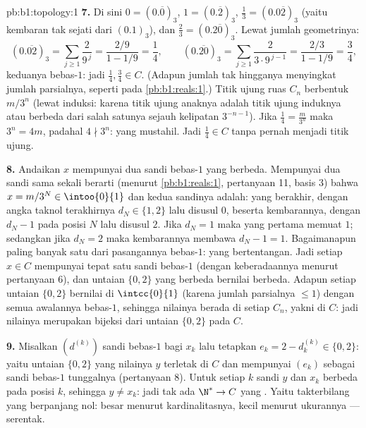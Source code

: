 \begin{solution}{pb:b1:topology:1}
\textbf{7.} Di sini $0 = (0.\overline 0)_3$, $1 = (0.\overline 2)_3$,
$\frac13 = (0.0\overline{2})_3$ (yaitu kembaran tak sejati dari $(0.1)_3$),
dan $\frac23 = (0.2\overline{0})_3$. Lewat jumlah geometrinya:
\[
(0.\overline{02})_3 = \sum_{j\geq1} \frac{2}{9^{\,j}}
= \frac{2/9}{1 - 1/9} = \frac14 ,
\qquad
(0.\overline{20})_3 = \sum_{j\geq1} \frac{2}{3\cdot 9^{\,j-1}}
= \frac{2/3}{1 - 1/9} = \frac34 ,
\]
keduanya bebas-$1$: jadi $\frac14, \frac34 \in C$. (Adapun jumlah tak hingganya
menyingkat  jumlah parsialnya, seperti pada \cref{pb:b1:reals:1}.)
Titik ujung ruas $C_n$ berbentuk $m/3^n$
(lewat induksi: karena titik ujung anaknya adalah titik ujung induknya atau berbeda
dari salah satunya sejauh kelipatan $3^{-n-1}$). Jika $\frac14 =
\frac{m}{3^n}$ maka $3^n = 4m$, padahal $4 \nmid 3^n$: yang mustahil.
Jadi $\frac14 \in C$ tanpa pernah menjadi titik ujung.

\textbf{8.} Andaikan $x$ mempunyai dua sandi bebas-$1$ yang berbeda. Mempunyai
dua sandi sama sekali berarti (menurut \cref{pb:b1:reals:1}, pertanyaan 11, basis
$3$) bahwa $x = m/3^N \in \intoo{0}{1}$ dan kedua sandinya adalah:
yang berakhir, dengan angka taknol terakhirnya $d_N \in \{1, 2\}$
lalu disusul $0$, beserta kembarannya, dengan $d_N - 1$ pada posisi $N$
lalu disusul $2$. Jika $d_N = 1$ maka yang pertama memuat $1$; sedangkan jika $d_N
= 2$ maka kembarannya membawa $d_N - 1 = 1$. Bagaimanapun paling banyak satu
dari pasangannya bebas-$1$: yang bertentangan. Jadi setiap $x \in C$ mempunyai
tepat satu sandi bebas-$1$ (dengan keberadaannya menurut pertanyaan 6), dan
untaian $\{0,2\}$ yang berbeda bernilai berbeda. Adapun setiap
untaian $\{0,2\}$ bernilai di $\intcc{0}{1}$ (karena jumlah parsialnya $\leq
1$) dengan semua awalannya bebas-$1$, sehingga nilainya berada di setiap $C_n$,
yakni di $C$: jadi  nilainya merupakan bijeksi dari
untaian $\{0,2\}$ pada $C$.

\textbf{9.} Misalkan $(d^{(k)})$ sandi bebas-$1$ bagi $x_k$ lalu
tetapkan $e_k = 2 - d^{(k)}_k \in \{0, 2\}$: yaitu untaian $\{0,2\}$ yang
nilainya $y$ terletak di $C$ dan mempunyai $(e_k)$ sebagai sandi bebas-$1$
tunggalnya (pertanyaan 8). Untuk setiap $k$ sandi $y$ dan $x_k$
berbeda pada posisi $k$, sehingga $y \neq x_k$: jadi tak ada  $\N^* \to C$ yang
. Yaitu  takterbilang yang berpanjang nol: besar menurut
kardinalitasnya, kecil menurut ukurannya --- serentak.


\end{solution}
